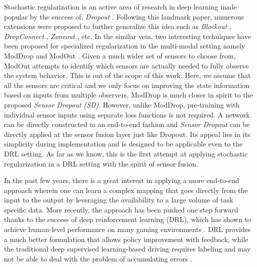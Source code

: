 \documentclass[../thesis.tex]{subfiles}
\begin{document}

Stochastic regularization is an active area of research in deep learning made popular by the success of, \textit{Dropout} \cite{dropout}. Following this landmark paper, numerous extensions were proposed  to further generalize this idea such as \textit{Blockout} \cite{blockout}, \textit{DropConnect} \cite{dropconnect}, \textit{Zoneout} \cite{zoneout}, etc. In the similar vein, two interesting techniques have been proposed for specialized regularization in the multi-modal setting namely ModDrop \cite{moddrop} and ModOut \cite{modout}. 
Given a much wider set of sensors to choose from, ModOut attempts to identify which sensors are actually needed to fully observe the system behavior. This is out of the scope of this work. Here, we assume that all the sensors are critical and we only focus on improving the state information based on inputs from multiple observers. 
ModDrop is much closer in spirit to the proposed \emph{Sensor Dropout (SD)}. However, unlike ModDrop, pre-training with individual sensor inputs using separate loss functions is not required. A network can be directly constructed in an end-to-end fashion and \emph{Sensor Dropout} can be directly applied at the sensor fusion layer just like Dropout. Its appeal lies in its simplicity during implementation and is designed to be applicable even to the DRL setting. As far as we know, this is the first attempt at applying stochastic regularization in a DRL setting with the spirit of sensor fusion. 






In the past few years, there is a great interest in applying a more end-to-end approach \cite{deepdriving,nvidiacar,endtoendcars} wherein one can learn a complex mapping that goes directly from the input to the output by leveraging the availability to a large volume of task specific data. More recently, the approach has been pushed one step forward thanks to the success of deep reinforcement learning (DRL), which has shown to achieve human-level performance on many gaming environments \cite{mnih2013playing, mnih2015human,2016-TOG-deepRL}. DRL provides a much better formulation that allows policy improvement with feedback, while the traditional deep supervised learning-based driving requires labeling and may not be able to deal with the problem of accumulating errors \cite{ross2011reduction}. 
\end{document}
